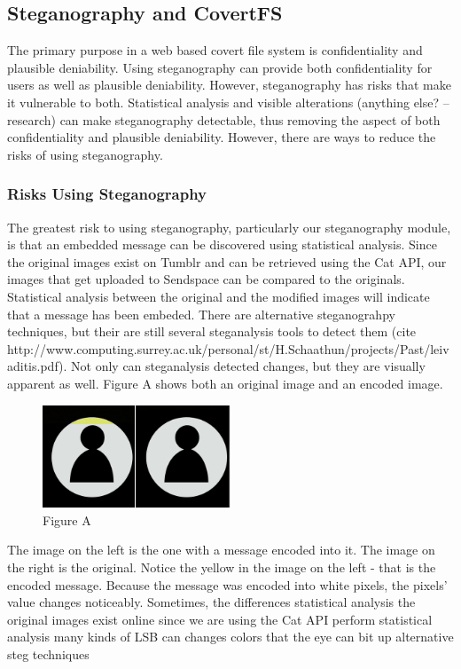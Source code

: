 \subsection{Steganography and CovertFS}
The primary purpose in a web based covert file system is confidentiality and plausible deniability. Using steganography can provide both confidentiality for users as well as plausible deniability. However, steganography has risks that make it vulnerable to both. Statistical analysis and visible alterations (anything else? -- research) can make steganography detectable, thus removing the aspect of both confidentiality and plausible deniability. However, there are ways to reduce the risks of using steganography. 

\subsubsection{Risks Using Steganography}
The greatest risk to using steganography, particularly our steganography module, is that an embedded message can be discovered using statistical analysis. Since the original images exist on Tumblr and can be retrieved using the Cat API, our images that get uploaded to Sendspace can be compared to the originals. Statistical analysis between the original and the modified images will indicate that a message has been embeded. There are alternative steganograhpy techniques, but their are still several steganalysis tools to detect them (cite http://www.computing.surrey.ac.uk/personal/st/H.Schaathun/projects/Past/leivaditis.pdf). Not only can steganalysis detected changes, but they are visually apparent as well. Figure A shows both an original image and an encoded image.
\begin{figure}[h]
\includegraphics[width=0.5\textwidth]{comparison}
\caption{Figure A}
\end{figure}
The image on the left is the one with a message encoded into it. The image on the right is the original. Notice the yellow in the image on the left - that is the encoded message. Because the message was encoded into white pixels, the pixels' value changes noticeably.  
Sometimes, the differences 
statistical analysis
		the original images exist online since we are using the Cat API
		perform statistical analysis
	many kinds of LSB can changes colors that the eye can bit up
	alternative steg techniques

